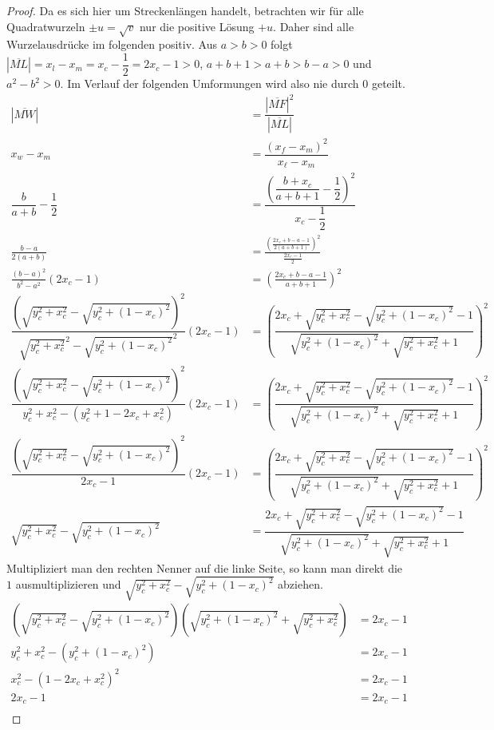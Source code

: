 \documentclass{article}
\newcommand{\strecke}[1]{\left|\overline{#1}\right|}
\begin{document}
    \begin{proof}
    \allowdisplaybreaks
    Da es sich hier um Streckenlängen handelt, betrachten wir für alle Quadratwurzeln $\pm u = \sqrt{v}$ nur die positive Lösung $+u$. Daher sind alle Wurzelausdrücke im folgenden positiv.
    Aus $a>b>0$ folgt $\strecke{ML} = x_l-x_m = x_c-\dfrac{1}{2} = 2x_c-1> 0$, $a+b+1>a+b> b-a>0$ und $a^2-b^2>0$. Im Verlauf der folgenden Umformungen wird also nie durch 0 geteilt.
    \begin{align*}
        \strecke{MW} &= \dfrac{\strecke{MF}^2}{\strecke{ML}}\\
        x_w-x_m &= \dfrac{(x_f-x_m)^2}{x_\ell-x_m}\\
        \dfrac{b}{a+b}-\dfrac{1}{2} &= \dfrac{\left(\dfrac{b+x_c}{a+b+1}-\dfrac{1}{2}\right)^2}{x_c-\dfrac{1}{2}}\\
        \frac{b-a}{2(a+b)} &= \frac{\left(\frac{2x_c+b-a-1}{2(a+b+1)}\right)^2}{\frac{2x_c-1}{2}}\\
        \frac{(b-a)^2}{b^2-a^2}(2x_c-1)&= \left(\frac{2x_c+b-a-1}{a+b+1}\right)^2\\
        \dfrac{\left(\sqrt{y_c^2+x_c^2}-\sqrt{y_c^2+(1-x_c)^2}\right)^2}{\sqrt{y_c^2+x_c^2}^2-\sqrt{y_c^2+(1-x_c)^2}^2}(2x_c-1) &= \left(\dfrac{2x_c+\sqrt{y_c^2+x_c^2}-\sqrt{y_c^2+(1-x_c)^2}-1}{\sqrt{y_c^2+(1-x_c)^2}+\sqrt{y_c^2+x_c^2}+1}\right)^2\\
        \dfrac{\left(\sqrt{y_c^2+x_c^2}-\sqrt{y_c^2+(1-x_c)^2}\right)^2}{y_c^2+x_c^2-(y_c^2+1-2x_c + x_c^2)}(2x_c-1) &= \left(\dfrac{2x_c+\sqrt{y_c^2+x_c^2}-\sqrt{y_c^2+(1-x_c)^2}-1}{\sqrt{y_c^2+(1-x_c)^2}+\sqrt{y_c^2+x_c^2}+1}\right)^2\\
        \dfrac{\left(\sqrt{y_c^2+x_c^2}-\sqrt{y_c^2+(1-x_c)^2}\right)^2}{2x_c-1}(2x_c-1) &= \left(\dfrac{2x_c+\sqrt{y_c^2+x_c^2}-\sqrt{y_c^2+(1-x_c)^2}-1}{\sqrt{y_c^2+(1-x_c)^2}+\sqrt{y_c^2+x_c^2}+1}\right)^2\\
        \sqrt{y_c^2+x_c^2}-\sqrt{y_c^2+(1-x_c)^2} &= \dfrac{2x_c+\sqrt{y_c^2+x_c^2}-\sqrt{y_c^2+(1-x_c)^2}-1}{\sqrt{y_c^2+(1-x_c)^2}+\sqrt{y_c^2+x_c^2}+1}
        \end{align*}
        Multipliziert man den rechten Nenner auf die linke Seite, so kann man direkt die $1$ ausmultiplizieren und $\sqrt{y_c^2+x_c^2}-\sqrt{y_c^2+(1-x_c)^2}$ abziehen.
        \begin{align*}
        \left(\sqrt{y_c^2+x_c^2}-\sqrt{y_c^2+(1-x_c)^2}\right)\left(\sqrt{y_c^2+(1-x_c)^2}+\sqrt{y_c^2+x_c^2}\right) &= 2x_c-1\\
        y_c^2+x_c^2 - \left(y_c^2+(1-x_c)^2\right) &= 2x_c - 1\\
        x_c^2 -(1-2x_c+ x_c^2)^2 &= 2x_c - 1\\
        2x_c - 1 &= 2x_c - 1\\
    \end{align*}
    \end{proof}
\end{document}
